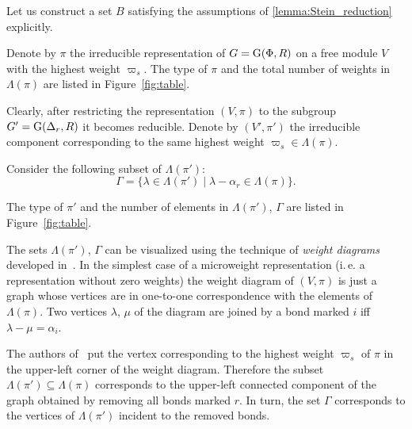 Let us construct a set $B$ satisfying the assumptions of \cref{lemma:Stein_reduction} explicitly.

Denote by $\pi$ the irreducible representation of $G=\operatorname{G}(\Phi, R)$ on a free module $V$ with the highest weight $\varpi_s$.
The type of $\pi$ and the total number of weights in $\Lambda(\pi)$ are listed in Figure~\ref{fig:table}.

Clearly, after restricting the representation $(V, \pi)$ to the subgroup $G'=\operatorname{G}(\Delta_r, R)$ it becomes reducible.
Denote by $(V', \pi')$ the irreducible component corresponding to the same highest weight $\varpi_s \in \Lambda(\pi)$.

Consider the following subset of $\Lambda(\pi')$:
$$ \Gamma = \{\lambda \in \Lambda(\pi') \mid \lambda - \alpha_r \in \Lambda(\pi) \}.$$

The type of $\pi'$ and the number of elements in $\Lambda(\pi')$, $\Gamma$ are listed in Figure~\ref{fig:table}.

\begin{rem}
The sets $\Lambda(\pi')$, $\Gamma$ can be visualized using the technique of {\it weight diagrams} developed in~\cite{PSV98}.
In the simplest case of a microweight representation (i.\,e. a representation without zero weights)
the weight diagram of $(V, \pi)$ is just a graph whose vertices are in one-to-one correspondence with the elements of $\Lambda(\pi)$.
Two vertices $\lambda$, $\mu$ of the diagram are joined by a bond marked $i$ iff $\lambda-\mu = \alpha_i$.

The authors of~\cite{PSV98} put the vertex corresponding to the highest weight $\varpi_s$ of $\pi$ in the upper-left corner of the weight diagram.
Therefore the subset $\Lambda(\pi') \subseteq \Lambda(\pi)$ corresponds to the upper-left connected component of the graph obtained by removing all bonds marked $r$.
In turn, the set $\Gamma$ corresponds to the vertices of $\Lambda(\pi')$ incident to the removed bonds.
\end{rem}

